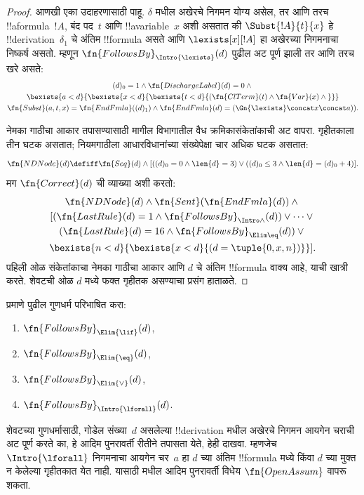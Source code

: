 \documentclass[../../../include/open-logic-section]{subfiles}
\begin{document}
\begin{proof}
  आणखी एका उदाहरणासाठी \Intro{\lexists} पाहू. $\delta$ मधील
  अखेरचे निगमन योग्य असेल, तर आणि तरच !!a{formula}~$!A$,
  बंद पद~$t$ आणि !!a{variable}~$x$ अशी असतात की
  $\Subst{!A}{t}{x}$ हे !!{derivation}~$\delta_1$ चे अंतिम
  !!{formula} असते आणि $\lexists[x][!A]$ हा अखेरच्या निगमनाचा
  निष्कर्ष असतो. म्हणून $\fn{FollowsBy}_{\Intro{\lexists}}(d)$
  पुढील अट पूर्ण झाली तर आणि तरच खरे असते:
  \begin{multline*}
    (d)_0 = 1 \land \fn{DischargeLabel}(d) = 0 \land {} \\
    \bexists{a < d}{\bexists{x<d}{\bexists{t<d}{
          (\fn{ClTerm}(t) \land \fn{Var}(x)  \land {}}}}\\
    \fn{Subst}(a,t,x) = \fn{EndFmla}((d)_1) \land
    \fn{EndFmla}(d) = (\Gn{\lexists} \concat x \concat a)).
  \end{multline*}

नेमका गाठीचा आकार तपासण्यासाठी मागील विभागातील वैध क्रमिकासंकेतांकाची
अट वापरा. गृहीतकाला तीन घटक असतात; नियमगाठीला आधारविधानांच्या
संख्येपेक्षा चार अधिक घटक असतात:
\[
\fn{NDNode}(d) \defiff \fn{Seq}(d) \land
[((d)_0=0 \land \len{d}=3) \lor ((d)_0\le3 \land \len{d}=(d)_0+4)].
\]
  मग $\fn{Correct}(d)$ ची व्याख्या अशी करतो:
  \begin{multline*}
    \fn{NDNode}(d) \land \fn{Sent}(\fn{EndFmla}(d)) \land {}\\
    [(\fn{LastRule}(d) = 1 \land
    \fn{FollowsBy}_{\Intro\land}(d)) \lor \dots \lor {}\\
    (\fn{LastRule}(d) = 16 \land \fn{FollowsBy}_{\Elim\eq}(d)) \lor {}\\
    \bexists{n<d}{\bexists{x<d}{(d = \tuple{0, x, n})}}].
  \end{multline*}
  पहिली ओळ संकेतांकाचा नेमका गाठीचा आकार आणि $d$ चे अंतिम !!{formula} वाक्य आहे, याची खात्री
  करते. शेवटची ओळ $d$ मध्ये फक्त गृहीतक असण्याचा प्रसंग हाताळते.
\end{proof}

\begin{prob}
   प्रमाणे पुढील गुणधर्म
  परिभाषित करा:
  \begin{enumerate}
  \item $\fn{FollowsBy}_{\Elim{\lif}}(d)$,
  \item $\fn{FollowsBy}_{\Elim{\eq}}(d)$,
  \item $\fn{FollowsBy}_{\Elim{\lor}}(d)$,
  \item $\fn{FollowsBy}_{\Intro{\lforall}}(d)$.
  \end{enumerate}
  शेवटच्या गुणधर्मासाठी, गोडेल संख्या~$d$ असलेल्या
  !!{derivation} मधील अखेरचे निगमन आयगेन चराची अट पूर्ण करते
  का, हे आदिम पुनरावर्ती रीतीने तपासता येते, हेही दाखवा.
  म्हणजेच $\Intro{\lforall}$ निगमनाचा आयगेन चर~$a$ हा
  $d$ च्या अंतिम !!{formula} मध्ये किंवा $d$ च्या मुक्त न केलेल्या
  गृहीतकात येत नाही. यासाठी
   मधील आदिम पुनरावर्ती
  विधेय $\fn{OpenAssum}$ वापरू शकता.
\end{prob}
\end{document}
